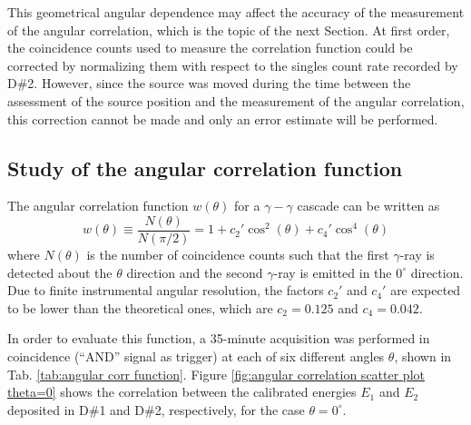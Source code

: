 \documentclass[a4paper]{article}
\begin{document}
This geometrical angular dependence may affect the accuracy of the measurement of the angular correlation, which is the topic of the next Section. 
At first order, the coincidence counts used to measure the correlation function could be corrected by normalizing them with respect to the singles count rate recorded by D\#2. However, since the source was moved during the time between the assessment of the source position and the measurement of the angular correlation, this correction cannot be made and only an error estimate will be performed.


\subsection{Study of the angular correlation function} \label{sect: angular}
The angular correlation function $w(\theta)$ for a $\gamma-\gamma$ cascade can be written as
\begin{equation}\label{eq:w(theta)}
        w(\theta)\equiv\frac{N(\theta)}{N(\pi/2)}=1+c_2'\cos^2(\theta)+c_4'\cos^4(\theta)
\end{equation}
where $N(\theta)$ is the number of coincidence counts such that the first $\gamma$-ray is detected about the $\theta$ direction and the second $\gamma$-ray is emitted in the $0^\circ$ direction. 
Due to finite instrumental angular resolution, the factors $c_2'$ and $c_4'$ are expected to be lower than the theoretical ones, which are $c_2=0.125$ and $c_4=0.042$.

In order to evaluate this function, a 35-minute acquisition was performed in coincidence (“AND” signal as trigger) at each of six different angles $\theta$, shown in Tab. \ref{tab:angular corr function}. 
Figure \ref{fig:angular correlation scatter plot theta=0} shows the correlation between the calibrated energies $E_1$ and $E_2$ deposited in D\#1 and D\#2, respectively, for the case $\theta=0^\circ$.
\vspace{-0.4cm}
\end{document}
